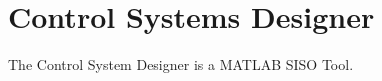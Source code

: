\documentclass[12pt,letter]{article}
\begin{document}
	
%	

	\setcounter{section}{10}	
	\setcounter{figure}{\thesection}   
	\renewcommand\thefigure{\thesection.\arabic{figure}}
	\setcounter{equation}{\thesection}   
	\renewcommand\theequation{\thesection.\arabic{equation}}

\section{Control Systems Designer}

The Control System Designer is a MATLAB SISO Tool.











	\pagebreak
	\renewcommand{\thepage}{}
	\renewcommand\refname{References Cited}
	\pagestyle{plain}
	
	
\end{document}
